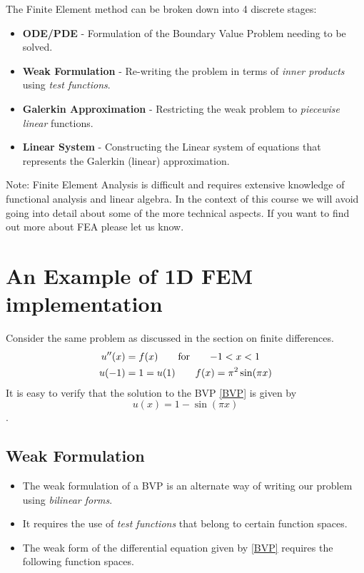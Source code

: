 \documentclass[12pt]{report}
\begin{document}
The Finite Element method can be broken down into 4 discrete stages:

\begin{itemize}
\item \textbf{ODE/PDE} - Formulation of the Boundary Value Problem needing to be solved.
\item \textbf{Weak Formulation} - Re-writing the problem in terms of \textit{inner products} using \textit{test functions}.
\item \textbf{Galerkin Approximation} - Restricting the weak problem to \textit{piecewise linear} functions.
\item \textbf{Linear System} - Constructing the Linear system of equations that represents the Galerkin (linear) approximation.
\end{itemize}

Note: Finite Element Analysis is difficult and requires extensive knowledge of functional analysis and linear algebra. In the context of this course we will avoid going into detail about some of the more technical aspects. If you want to find out more about FEA please let us know.

\section*{An Example of 1D FEM implementation}

Consider the same problem as discussed in the section on finite differences.
%
\begin{subequations}\label{BVP}
\begin{align}
u''(x)&=f(x)\qquad\textnormal{for}\qquad{-1}<x<1 \\
u(-1)&=1=u(1) \qquad f(x)=\pi^2\sin(\pi{x})
\end{align}
\end{subequations}
%
It is easy to verify that the solution to the BVP \eqref{BVP} is given by $$u(x)=1-\sin(\pi{x})$$. 

\subsection*{Weak Formulation}

\begin{itemize}
\item The weak formulation of a BVP is an alternate way of writing our problem using \textit{bilinear forms}.
\item It requires the use of \textit{test functions} that belong to certain function spaces.
\item The weak form of the differential equation given by \eqref{BVP} requires the following function spaces.
\end{itemize}
\end{document}
